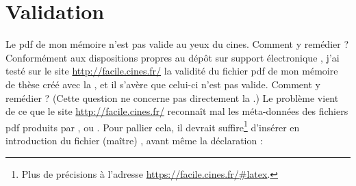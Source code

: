 \section{Validation}
\label{sec-validation}

\begin{dbfaq}{Le \acrshort{pdf} de mon mémoire n'est pas valide au yeux du
    \acrshort{cines}. Comment y remédier ?}{}
  Conformément aux dispositions propres au dépôt sur support électronique
  \autocite{guidoct-abes}, j'ai testé sur le site \url{http://facile.cines.fr/}
  la validité du fichier \acrshort{pdf} de mon mémoire de thèse créé avec la
  \yatCl{}, et il s'avère que celui-ci n'est pas valide. Comment y remédier ?
  \tcblower
  (Cette question ne concerne pas directement la \yatCl{}.) Le problème vient de
  ce que le site \url{http://facile.cines.fr/} reconnaît mal les méta-données
  des fichiers \acrshort{pdf} produits par ,  ou
  .
  Pour pallier cela, il devrait suffire\footnote{Plus de précisions à l'adresse
    \url{https://facile.cines.fr/\#latex}.} d'insérer en introduction du fichier
  (maître) , avant même la déclaration
   :
\begin{preamblecode}
\end{preamblecode}
\end{dbfaq}

